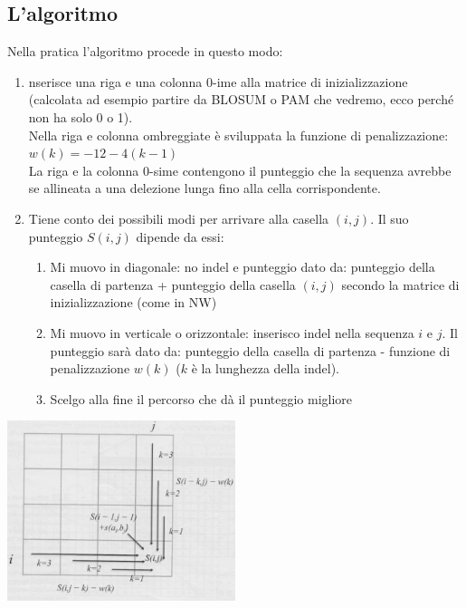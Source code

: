 \documentclass{article}
\begin{document}
\subsection{L'algoritmo}
Nella pratica l'algoritmo procede in questo modo:
\begin{enumerate}
    \item nserisce una riga e una colonna 0-ime alla matrice
    di inizializzazione (calcolata ad esempio partire da
    BLOSUM o PAM che vedremo, ecco perché non ha
    solo 0 o 1). \\ Nella riga e colonna
    ombreggiate è
    sviluppata la funzione di
    penalizzazione: $w(k) = -12-4(k-1)$\\
    La riga e la colonna 0-sime contengono il
    punteggio che la
    sequenza avrebbe se
    allineata a una delezione
    lunga fino alla cella
    corrispondente.
    \item Tiene conto dei possibili modi per arrivare alla
    casella $(i,j)$. Il suo punteggio $S(i,j)$ dipende da essi:
    \begin{enumerate}
        \item Mi muovo in diagonale: no indel e
        punteggio dato da: punteggio
        della casella di partenza +
        punteggio della casella $(i,j)$
        secondo la matrice di
        inizializzazione (come in NW)
        \item Mi muovo in verticale o
        orizzontale: inserisco indel nella
        sequenza $i$ e $j$. Il punteggio sarà
        dato da: punteggio della casella
        di partenza - funzione di
        penalizzazione $w(k)$ ($k$ è la
        lunghezza della indel).
        \item Scelgo alla fine il percorso che dà
        il punteggio migliore
    \end{enumerate}
\end{enumerate}
\begin{center}
    \includegraphics[width=0.5\textwidth]{figures/nw.png}
\end{center}
\end{document}
